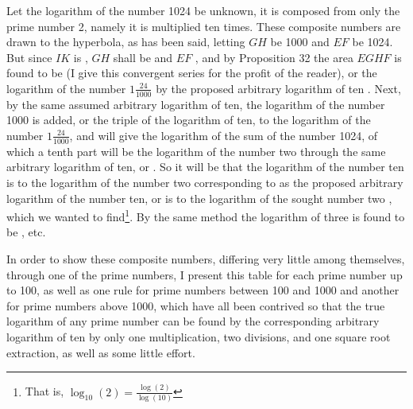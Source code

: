 \documentclass[11pt,letterpaper]{book}
\begin{document}
\noindent Let the logarithm of the number 1024 be unknown, it is composed from
only the prime number 2, namely it is multiplied ten times. These composite
numbers are drawn to the hyperbola, as has been said, letting $GH$ be 1000 and
$EF$ be 1024. But since $IK$ is , $GH$ shall be
 and $EF$ , and by
Proposition 32 the area $EGHF$ is found to be
 (I give this convergent series for the
profit of the reader), or the logarithm of the number $1\frac{24}{1000}$ by the
proposed arbitrary logarithm of ten . Next,
by the same assumed arbitrary logarithm of ten, the logarithm of the number 1000
is added, or the triple of the logarithm of ten, to the logarithm of the number
$1\frac{24}{1000}$, and will give the logarithm of the sum of the number 1024,
of which a tenth part will be the logarithm of the number two through the same
arbitrary logarithm of ten, or . So it will
be that the logarithm of the number ten  is
to the logarithm of the number two corresponding to
 as the proposed arbitrary logarithm of the
number ten, or  is to the logarithm of the
sought number two , which we wanted to
find\footnote{That is, $\log_10 \left(2\right) = \frac{\log \left(2\right)}{\log
\left(10\right)}$}.
By the same method the logarithm of three is found to be
, etc.

In order to show these composite numbers, differing very little among
themselves, through one of the prime numbers, I present this table for each
prime number up to 100, as well as one rule for prime numbers between 100 and
1000 and another for prime numbers above 1000, which have all been contrived so
that the true logarithm of any prime number can be found by the corresponding
arbitrary logarithm of ten  by only one
multiplication, two divisions, and one square root extraction, as well as some
little effort.
\end{document}
